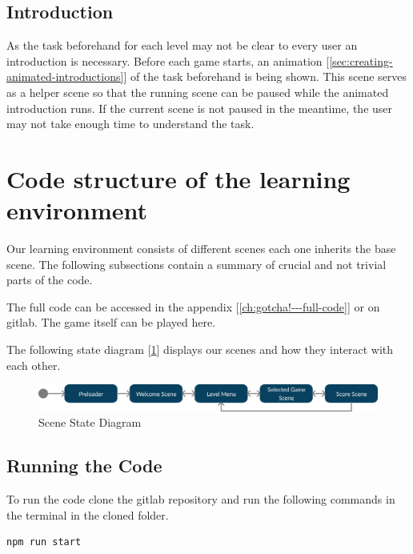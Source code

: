 \subsection{Introduction}\label{subsec:introduction}
As the task beforehand for each level may not be clear to every user an introduction is necessary.
Before each game starts, an animation [\ref{sec:creating-animated-introductions}] of the task beforehand is being shown.
This scene serves as a helper scene so that the running scene can be paused while the animated introduction runs.
If the current scene is not paused in the meantime, the user may not take enough time to understand the task.

\section{Code structure of the learning environment}\label{sec:code-structure-of-the-learning-environment}
Our learning environment consists of different scenes each one inherits the base scene.
The following subsections contain a summary of crucial and not trivial parts of the code.

The full code can be accessed in the appendix [\ref{ch:gotcha!---full-code}] or on gitlab\cite{gitlab-thesis}.
The game itself can be played here\cite{gotscha}.

The following state diagram [\ref{fig:statediagram}] displays our scenes and how they interact with each other.

\begin{figure}[H]
    \centering
    \includegraphics[width=1\textwidth]{figures/statediagram}
    \caption{Scene State Diagram}
    \label{fig:statediagram}
\end{figure}

\subsection{Running the Code}\label{subsec:running-the-code}
To run the code clone the gitlab repository\cite{gitlab-thesis} and run the following commands in the terminal in the cloned folder.

\begin{lstlisting}[style=TypeScript, caption={BaseScene.ts}]
    npm run start
\end{lstlisting}

